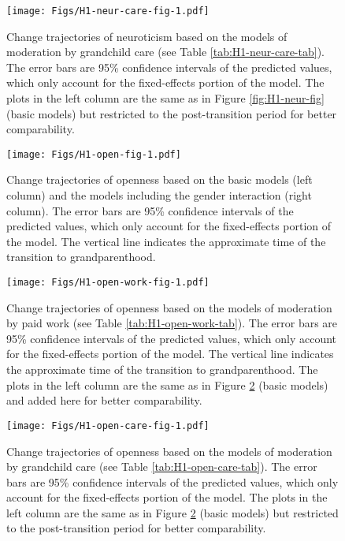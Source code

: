 \documentclass[
  english,
  man, noextraspace,floatsintext]{apa7}
\begin{document}
\begin{appendix}
\begin{figure}
\centering
\texttt{[image: Figs/H1-neur-care-fig-1.pdf]}
\caption{\label{fig:H1-neur-care-fig}Change trajectories of neuroticism based on
the models of moderation by grandchild care (see Table
\ref{tab:H1-neur-care-tab}). The error bars are 95\% confidence
intervals of the predicted values, which only account for the
fixed-effects portion of the model. The plots in the left column are the
same as in Figure \ref{fig:H1-neur-fig} (basic models) but restricted to
the post-transition period for better comparability.}
\end{figure}








\begin{figure}
\centering
\texttt{[image: Figs/H1-open-fig-1.pdf]}
\caption{\label{fig:H1-open-fig}Change trajectories of openness based on the basic
models (left column) and the models including the gender interaction
(right column). The error bars are 95\% confidence intervals of the
predicted values, which only account for the fixed-effects portion of
the model. The vertical line indicates the approximate time of the
transition to grandparenthood.}
\end{figure}










\begin{figure}
\centering
\texttt{[image: Figs/H1-open-work-fig-1.pdf]}
\caption{\label{fig:H1-open-work-fig}Change trajectories of openness based on the
models of moderation by paid work (see Table
\ref{tab:H1-open-work-tab}). The error bars are 95\% confidence
intervals of the predicted values, which only account for the
fixed-effects portion of the model. The vertical line indicates the
approximate time of the transition to grandparenthood. The plots in the
left column are the same as in Figure \ref{fig:H1-open-fig} (basic
models) and added here for better comparability.}
\end{figure}









\begin{figure}
\centering
\texttt{[image: Figs/H1-open-care-fig-1.pdf]}
\caption{\label{fig:H1-open-care-fig}Change trajectories of openness based on the
models of moderation by grandchild care (see Table
\ref{tab:H1-open-care-tab}). The error bars are 95\% confidence
intervals of the predicted values, which only account for the
fixed-effects portion of the model. The plots in the left column are the
same as in Figure \ref{fig:H1-open-fig} (basic models) but restricted to
the post-transition period for better comparability.}
\end{figure}









\end{appendix}
\end{document}
